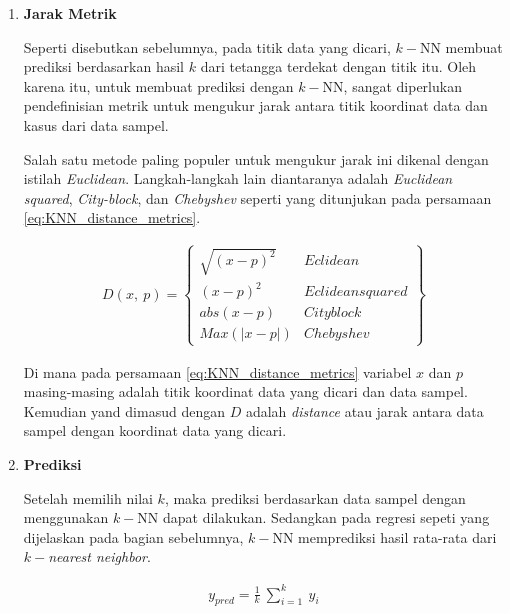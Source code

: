 \begin{enumerate}[label=\textbf{\alph*).}]
	\item \textbf{Jarak Metrik}
	
	Seperti disebutkan sebelumnya, pada titik data yang dicari, $k-$NN membuat prediksi berdasarkan hasil $k$ dari tetangga terdekat dengan titik itu. Oleh karena itu, untuk membuat prediksi dengan $k-$NN, sangat diperlukan pendefinisian metrik untuk mengukur jarak antara titik koordinat data dan kasus dari data sampel. 
	\vspace{1ex}
	
	Salah satu metode paling populer untuk mengukur jarak ini dikenal dengan istilah \textit{Euclidean}. Langkah-langkah lain diantaranya adalah \textit{Euclidean squared}, \textit{City-block}, dan \textit{Chebyshev} seperti yang ditunjukan pada persamaan \ref{eq:KNN_distance_metrics}.
	\vspace{1ex}
	
	\begin{equation}\label{eq:KNN_distance_metrics}
	\begin{split}
	D(x,\ p) =
	\begin{Bmatrix}
	\sqrt{(x - p)^{2}} & Eclidean\\
	(x - p)^{2} & Eclidean squared\\
	abs(x - p) & Cityblock\\
	Max(|x - p|) & Chebyshev
	\end{Bmatrix}
	\end{split}
	\end{equation}
	
	Di mana pada persamaan \ref{eq:KNN_distance_metrics} variabel $x$ dan $p$ masing-masing adalah titik koordinat data yang dicari dan data sampel. Kemudian yand dimasud dengan $D$ adalah \textit{distance} atau jarak antara data sampel dengan koordinat data yang dicari.
	
	\item \textbf{Prediksi}
	
	Setelah memilih nilai $k$, maka prediksi berdasarkan data sampel dengan menggunakan $k-$NN dapat dilakukan. Sedangkan pada regresi sepeti yang dijelaskan pada bagian sebelumnya, $k-$NN memprediksi hasil rata-rata dari $k-$\textit{nearest neighbor}.
	
	\begin{equation}\label{eq: KNN_prediction}
	\begin{split}
	y_{pred} = \frac{1}{k}\ \sum_{i = 1}^{k}\ y_{i}
	\end{split}
	\end{equation}
	

\end{enumerate}
